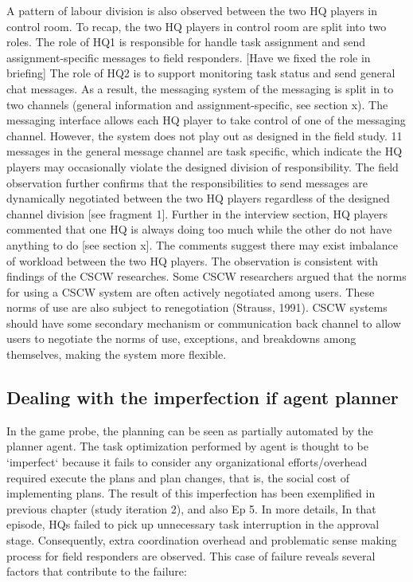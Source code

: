A pattern of labour division is also observed between the two HQ players in control room. To recap, the two HQ players in control room are split into two roles. The role of HQ1 is responsible for handle task assignment and send assignment-specific messages to field responders. [Have we fixed the role in briefing] The role of HQ2 is to support monitoring task status and send general chat messages. As a result, the messaging system of the messaging is split in to two channels (general information and assignment-specific, see section x). The messaging interface allows each HQ player to take control of one of the messaging channel.  However, the system does not play out as designed in the field study. 11 messages in the general message channel are task specific, which indicate the HQ players may occasionally violate the designed division of responsibility. The field observation further confirms that the responsibilities to send messages are dynamically negotiated between the two HQ players regardless of the designed channel division [see fragment 1]. Further in the interview section, HQ players commented that one HQ is always doing too much while the other do not have anything to do [see section x]. The comments suggest there may exist imbalance of workload between the two HQ players. The observation is consistent with findings of the CSCW researches. Some CSCW researchers argued that the norms for using a CSCW system are often actively negotiated among users. These norms of use are also subject to renegotiation (Strauss, 1991). CSCW systems should have some secondary mechanism or communication back channel to allow users to negotiate the norms of use, exceptions, and breakdowns among themselves, making the system more flexible.

\subsection{Dealing with the imperfection if agent planner}

In the game probe, the planning can be seen as partially automated by the planner agent. The task optimization performed by agent is thought to be `imperfect` because it fails to consider any organizational efforts/overhead required execute the plans and plan changes, that is, the social cost of implementing plans. The result of this imperfection has been exemplified in previous chapter (study iteration 2), and also Ep 5. In more details, In that episode, HQs failed to pick up unnecessary task interruption in the approval stage. Consequently, extra coordination overhead and problematic sense making process for field responders are observed. This case of failure reveals several factors that contribute to the failure: \\


